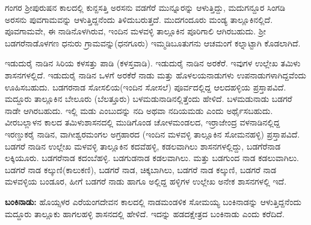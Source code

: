 \newpage

ಗಂಗರ ಶ‍್ರೀಪುರುಷನ ಕಾಲದಲ್ಲಿ ಕುನ್ದಸತ್ತಿ ಅರಸನು ವಡಗೆರೆ ಮುನ್ನೂರನ್ನು ಆಳುತ್ತಿದ್ದು, ಮದುಗನ್ದೂರ ಸಿಂಗಡಿ ಅರಸನು ಪುವಗಾಮವನ್ನು ಆಳುತ್ತಿದ್ದನೆಂದು ತಿಳಿದುಬರುತ್ತದೆ. ಮುದಗಂದೂರು ಮಂಡ್ಯ ತಾಲ್ಲೂಕಿನಲ್ಲಿದೆ. ಪೂವಗಾಮವೇ, ಈ ನಾಡಿನೊಳಗಿರುವ, ಇಂದಿನ ಮಳವಳ್ಳಿ ತಾಲ್ಲೂಕಿನ ಪೂರಿಗಾಲಿ ಆಗಿರಬಹುದು. ಶ‍್ರೀ ಬಡಗರೆನಾಡೊಳಗಣ ಧನುರು ಗ್ರಾಮವನ್ನು(ಧನಗೂರು) ಇಮ್ಮಡಿಬೂತುಗನು ಆಚಮಂಗೆ ಕಲ್ನಾಟ್ಟಾಗಿ ಕೊಡಲಾಗಿದೆ.

ಇಡುದುರೈ ನಾಡಿನ ಸಿರಿಯ ಕಳಸತ್ತು ಪಾಡಿ (ಕಳಸ್ತವಾಡಿ). ಇಡುದುರೈ ನಾಡಿನ ಅರಕೆರೆ. ಇವುಗಳ ಉಲ್ಲೇಖ ತಮಿಳು ಶಾಸನಗಳಲ್ಲಿದೆ. ಇಡುದುರೈ ನಾಡಿನ ಒಳಗೆ ಅರಕೆರೆ ನಾಡು ಮತ್ತು ಹೊಳಲಯನಾಡುಗಳು ಉಪನಾಡುಗಳಾಗಿದ್ದವೆಂದು ಊಹಿಸಬಹುದು. ಬಡಗರನಾಡ ಸೋಸಲಿಯ(ಇಂದಿನ ಸೋಸಲೆ) ಪೂರ್ವದಲ್ಲಿದ್ದ ಆಲದಹಳ್ಳಿಯ ಪ್ರಸ್ತಾಪವಿದೆ. ಮದ್ದೂರು ತಾಲ್ಲೂಕಿನ ಬೇಲೂರು (ಬೆಲತ್ತೂರು) ಬಳಮಡುನಾಡಿನಲ್ಲಿತ್ತೆಂದು ಹೇಳಿದೆ. ಬಳಮಡುನಾಡು ಬಡಗರೆ ನಾಡೇ ಆಗಿರಬಹುದು. ಇಲ್ಲಿ ಮಡು ಎಂಬುದನ್ನು ನದಿ ಅಥವಾ ನದಿಯಮಡು ಎಂದು ಅರ್ಥೈಸಬಹುದು. ವೀರಬಲ್ಲಾಳನ ಕಾಲದ ತಮಿಳುಶಾಸನದಲ್ಲಿ ಮುಡಿಗೊಂಡ ಚೋಳಮಂಡಲದ, ಇರ್ರಾಜೇಂದ್ರ ವಳನಾಡಿನಲ್ಲಿದ್ದ ಇರಣ್ಡುಕರೈ ನಾಡಿನ, ವಾಗೀಶ್ವರಮಂಗಲ ಅಗ್ರಹಾರದ (ಇಂದಿನ ಮಳವಳ್ಳಿ ತಾಲ್ಲೂಕಿನ ಸೋಮನಹಳ್ಳಿ) ಪ್ರಸ್ತಾಪವಿದೆ. ಬಡಗರೆ ನಾಡಿನ ಉಲ್ಲೇಖ ಮಳವಳ್ಳಿ ತಾಲ್ಲೂಕಿನ ಕದವೆಹಳ್ಳಿ, ಕಡಲವಾಗಿಲು ಶಾಸನಗಳಲ್ಲಿದ್ದು, ಬಡಗೆರೆನಾಡ ಲಕ್ಕಿಯೂರು. ಬಡಗರೆನಾಡ ಕದಂಬೆಹಳ್ಳಿ. ಬಡಗುಡನಾಡ ಕಡಲವಾಗಿಲು. ಮತ್ತು ಬಡಗುಂದ ನಾಡ ಕಡಲುವಾಗಿಲು. ಬಡಗರೆ ನಾಡ ಕಲ್ಕುಣಿ(ಕಾಲುಕಣಿ), ಬಡಗರೆ ನಾಡ, ಚಿಕ್ಕಬಾಗಿಲು, ಬಡಗರೆ ನಾಡ ಕಲ್ಕುಣಿ, ಬಡಗರೆ ನಾಡ ಮಳವಳ್ಳಿಯ ಬಂಡೂರ, ಹೀಗೆ ಬಡಗರೆ ನಾಡು ಹಾಗೂ ಅಲ್ಲಿದ್ದ ಹಳ್ಳಿಗಳ ಉಲ್ಲೇಖ ಅನೇಕ ಶಾಸನಗಳಲ್ಲಿ ಇದೆ.

\textbf{ಬಂಕಿನಾಡು:} ಹೊಯ್ಸಳರ ಎರೆಯಂಗದೇವನ ಕಾಲದಲ್ಲಿ ನಾಡಮಂಡಳಿಕ ಸೋಮಯ್ಯ ಬಂಕಿನಾಡನ್ನು ಆಳುತ್ತಿದ್ದ\-ನೆಂದು ಮದ್ದೂರು ತಾಲ್ಲೂಕು ಹಾಗಲಹಳ್ಳಿ ಶಾಸನದಲ್ಲಿ ಹೇಳಿದೆ. ಇದನ್ನು ಹಡದಕ್ಷೇತ್ರದ ಬಂಕಿನಾಡು ಎಂದು ಕರೆದಿದೆ.

